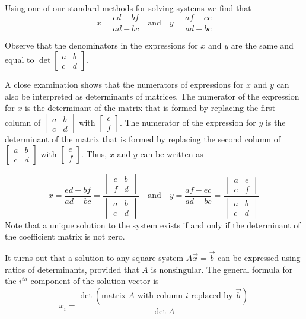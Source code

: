 \documentclass{ximera}
\begin{document}
 Using one of our standard methods for solving systems we find that
 $$x=\frac{ed-bf}{ad-bc}\quad\text{and}\quad y=\frac{af-ec}{ad-bc}$$
  
 Observe that the denominators in the expressions for $x$ and $y$ are the same and equal to $\det{\begin{bmatrix}a&b\\c&d\end{bmatrix}}$.
  
 A close examination shows that the numerators of expressions for $x$ and $y$ can also be interpreted as determinants of matrices. The numerator of the expression for $x$ is the determinant of the matrix that is formed by replacing the first column of $\begin{bmatrix}a&b\\c&d\end{bmatrix}$ with $\begin{bmatrix}e\\f\end{bmatrix}$.  The numerator of the expression for $y$ is the determinant of the matrix that is formed by replacing the second column of $\begin{bmatrix}a&b\\c&d\end{bmatrix}$ with $\begin{bmatrix}e\\f\end{bmatrix}$.  Thus, $x$ and $y$ can be written as
  
 $$x=\frac{ed-bf}{ad-bc}=\frac{\begin{vmatrix}e&b\\f&d\end{vmatrix}}{\begin{vmatrix}a&b\\c&d\end{vmatrix}}\quad\text{and}\quad y=\frac{af-ec}{ad-bc}=\frac{\begin{vmatrix}a&e\\c&f\end{vmatrix}}{\begin{vmatrix}a&b\\c&d\end{vmatrix}}$$
Note that a unique solution to the system exists if and only if the determinant of the coefficient matrix is not zero.
 
It turns out that a solution to any square system $A\vec{x}=\vec{b}$ can be expressed using ratios of determinants, provided that $A$ is nonsingular.  The general formula for the $i^{th}$ component of the solution vector is
$$x_i=\frac{\det{(\text{matrix } A \text{ with column } i \text{ replaced by } \vec{b})}}{\det{A}}$$
 
\end{document}
